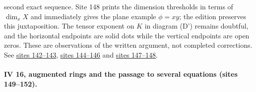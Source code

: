 \documentclass[10pt,a4paper]{article}
\begin{document}
second exact sequence. Site 148 prints the dimension thresholds in terms of $\dim_x X$ and immediately gives the plane example $\phi=xy$; the edition preserves this juxtaposition. The tensor exponent on $K$ in diagram (D') remains doubtful, and the horizontal endpoints are solid dots while the vertical endpoints are open zeros. These are observations of the written argument, not completed corrections. See \href{https://grothendieck.umontpellier.fr/web/viewer.html?file=../25.pdf#page=143}{sites 142--143}, \href{https://grothendieck.umontpellier.fr/web/viewer.html?file=../25.pdf#page=145}{sites 144--146} and \href{https://grothendieck.umontpellier.fr/web/viewer.html?file=../25.pdf#page=148}{sites 147--148}.

\paragraph{IV 16, augmented rings and the passage to several equations (sites 149--152).}
\end{document}

